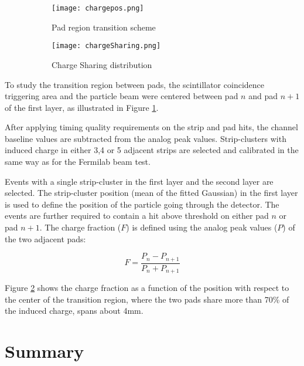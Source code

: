 \begin{figure}[t]
\centering
\hspace*{\fill}
\begin{subfigure}[b]{0.45\textwidth}
\texttt{[image: chargepos.png]}
\caption{Pad region transition scheme}\label{chargepos}
\end{subfigure}
\hfill
\begin{subfigure}[b]{0.45\textwidth}
\texttt{[image: chargeSharing.png]}
\caption{Charge Sharing distribution}\label{chargeSharing}
\hspace*{\fill}
\end{subfigure}
\caption{}\label{}
\end{figure}

To study the transition region between pads, the scintillator coincidence triggering area and the particle beam were
centered between pad $n$ and pad $n+1$ of the first layer, as illustrated in Figure \ref{chargepos}.\par

After applying timing quality requirements on the strip and pad hits, the channel baseline values are subtracted from
the analog peak values. Strip-clusters with induced charge in either 3,4 or 5 adjacent strips are selected and
calibrated in the same way as for the Fermilab beam test.\par

Events with a single strip-cluster in the first layer and the second layer are selected. The strip-cluster position
(mean of the fitted Gaussian) in the first layer is used to define the position of the particle going through the
detector. The events are further required to contain a hit above threshold on either pad $n$ or pad $n+1$. The charge
fraction ($F$) is defined using the analog peak values ($P$) of the two adjacent pads:

\begin{equation}
F = \frac{P_n - P_{n+1}}{P_n + P_{n+1}}
\end{equation}


Figure \ref{chargeSharing} shows the charge fraction as a function of the position with respect to the center of the
transition region, where the two pads share more than 70\% of the induced charge, spans about \unit{4}{mm}.\par

\section{Summary}

